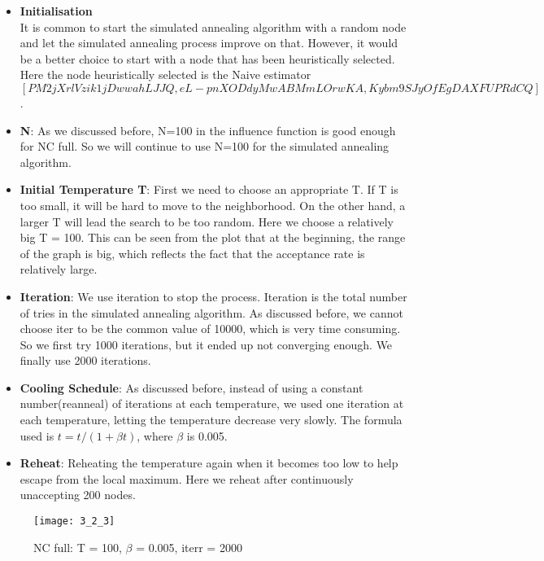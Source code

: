 \documentclass{article}
\begin{document}
\begin{itemize}
    \item \textbf{Initialisation}\\
It is common to start the simulated annealing algorithm with a random node and let the simulated annealing process improve on that. However, it would be a better choice to start with a node that has been heuristically selected. Here the node heuristically selected is the Naive estimator $[PM2jXrlVzik1jDwwahLJJQ, eL-pnXODdyMwABMmLOrwKA, Kybm9SJyOfEgDAXFUPRdCQ]$ .
    \item \textbf{N}: As we discussed before, N=100 in the influence function is good enough for NC full. So we will continue to use N=100 for the simulated annealing algorithm. 
    \item \textbf{Initial Temperature T}: First we need to choose an appropriate T. If T is too small, it will be hard to move to the neighborhood. On the other hand, a larger T will lead the search to be too random. Here we choose a relatively big T = 100. This can be seen from the plot that at the beginning, the range of the graph is big, which reflects the fact that the acceptance rate is relatively large. 
    \item \textbf{Iteration}: We use iteration to stop the process. Iteration is the total number of tries in the simulated annealing algorithm. As discussed before, we cannot choose iter to be the common value of 10000, which is very time consuming. So we first try 1000 iterations, but it ended up not converging enough. We finally use 2000 iterations.
    \item \textbf{Cooling Schedule}: As discussed before, instead of using a constant number(reanneal) of iterations at each temperature, we used  one iteration at each temperature, letting the temperature decrease very slowly. The formula used is $t = t/(1+\beta t)$, where $\beta$ is 0.005. 
    \item \textbf{Reheat}: Reheating the temperature again when it becomes too low to help escape from the local maximum. Here we reheat after continuously unaccepting 200 nodes.
\end{itemize}

\begin{figure}[h]
\begin{center}
\texttt{[image: 3\_2\_3]} %
\caption{NC full: T = 100,  $\beta$ = 0.005, iterr = 2000}
\end{center}
\end{figure}
\end{document}
